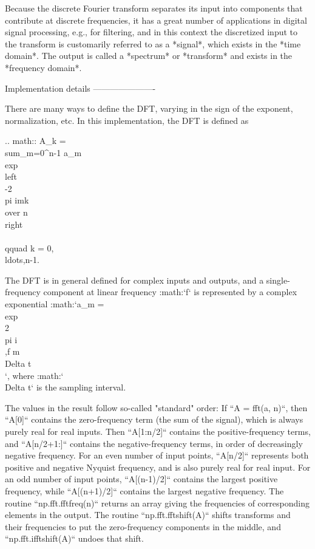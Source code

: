 \begin{DoxyVerb}
Because the discrete Fourier transform separates its input into
components that contribute at discrete frequencies, it has a great number
of applications in digital signal processing, e.g., for filtering, and in
this context the discretized input to the transform is customarily
referred to as a *signal*, which exists in the *time domain*.  The output
is called a *spectrum* or *transform* and exists in the *frequency
domain*.

Implementation details
----------------------

There are many ways to define the DFT, varying in the sign of the
exponent, normalization, etc.  In this implementation, the DFT is defined
as

.. math::
   A_k =  \\sum_{m=0}^{n-1} a_m \\exp\\left\\{-2\\pi i{mk \\over n}\\right\\}
   \\qquad k = 0,\\ldots,n-1.

The DFT is in general defined for complex inputs and outputs, and a
single-frequency component at linear frequency :math:`f` is
represented by a complex exponential
:math:`a_m = \\exp\\{2\\pi i\\,f m\\Delta t\\}`, where :math:`\\Delta t`
is the sampling interval.

The values in the result follow so-called "standard" order: If ``A =
fft(a, n)``, then ``A[0]`` contains the zero-frequency term (the sum of
the signal), which is always purely real for real inputs. Then ``A[1:n/2]``
contains the positive-frequency terms, and ``A[n/2+1:]`` contains the
negative-frequency terms, in order of decreasingly negative frequency.
For an even number of input points, ``A[n/2]`` represents both positive and
negative Nyquist frequency, and is also purely real for real input.  For
an odd number of input points, ``A[(n-1)/2]`` contains the largest positive
frequency, while ``A[(n+1)/2]`` contains the largest negative frequency.
The routine ``np.fft.fftfreq(n)`` returns an array giving the frequencies
of corresponding elements in the output.  The routine
``np.fft.fftshift(A)`` shifts transforms and their frequencies to put the
zero-frequency components in the middle, and ``np.fft.ifftshift(A)`` undoes
that shift.


\end{DoxyVerb}
